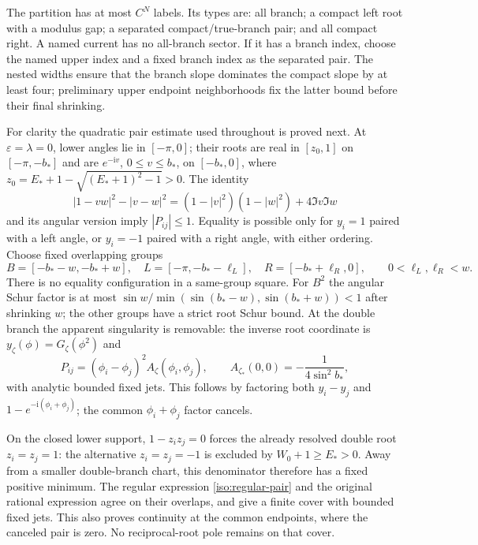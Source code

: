 \documentclass[11pt]{article}
\numberwithin{equation}{section}
\theoremstyle{definition}
\newcommand{\ii}{\mathrm i}
\newcommand{\eps}{\varepsilon}
\begin{document}
The partition has at most $C^N$ labels. Its types are: all branch; a
compact left root with a modulus gap; a separated compact/true-branch
pair; and all compact right. A named current has no all-branch sector.
If it has a branch index, choose the named upper index and a fixed branch
index as the separated pair. The nested widths ensure that the branch
slope dominates the compact slope by at least four; preliminary upper
endpoint neighborhoods fix the latter bound before their final shrinking.

For clarity the quadratic pair estimate used throughout is proved next.
At $\eps=\lambda=0$, lower angles lie in $[-\pi,0]$; their roots are
real in $[z_0,1]$ on $[-\pi,-b_*]$ and are $e^{-\ii v}$,
$0\le v\le b_*$, on $[-b_*,0]$, where
$z_0=E_*+1-\sqrt{(E_*+1)^2-1}>0$.
The identity
\begin{equation}
 |1-vw|^2-|v-w|^2
 =(1-|v|^2)(1-|w|^2)+4\Im v\Im w
 \label{iso:schur-gap}
\end{equation}
and its angular version imply $|P_{ij}|\le1$.
Equality is possible only for $y_i=1$ paired with a left angle, or
$y_i=-1$ paired with a right angle, with either ordering.
Choose fixed overlapping groups
\[
 B=[-b_*-w,-b_*+w],\quad
 L=[-\pi,-b_*-\ell_L],\quad R=[-b_*+\ell_R,0],
 \qquad0<\ell_L,\ell_R<w.
\]
There is no equality configuration in a same-group square.
For $B^2$ the angular Schur factor is at most
$\sin w/\min(\sin(b_*-w),\sin(b_*+w))<1$ after shrinking $w$;
the other groups have a strict root Schur bound. At the double branch
the apparent singularity is removable: the inverse root coordinate is
$y_\zeta(\phi)=G_\zeta(\phi^2)$ and
\begin{equation}
 P_{ij}=(\phi_i-\phi_j)^2 A_\zeta(\phi_i,\phi_j),
 \qquad A_{\zeta_*}(0,0)=-\frac1{4\sin^2b_*},
 \label{iso:regular-pair}
\end{equation}
with analytic bounded fixed jets. This follows by factoring both
$y_i-y_j$ and $1-e^{-\ii(\phi_i+\phi_j)}$; the common
$\phi_i+\phi_j$ factor cancels.

On the closed lower support, $1-z_i z_j=0$ forces the already resolved
double root $z_i=z_j=1$: the alternative $z_i=z_j=-1$ is excluded by
$W_0+1\ge E_*>0$. Away from a smaller double-branch chart, this
denominator therefore has a fixed positive minimum. The regular
expression \eqref{iso:regular-pair} and the original rational expression
agree on their overlaps, and give a finite cover with bounded fixed
jets. This also proves continuity at the common endpoints, where the
canceled pair is zero. No reciprocal-root pole remains on that cover.
\end{document}
